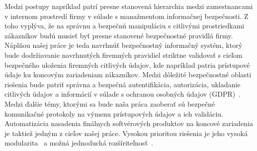 Medzi postupy napríklad patrí presne stanovená hierarchia medzi zamestnancami v internom prostredí firmy v súlade s manažmentom informačnej bezpečnosti.
Z toho vyplýva, že na správnu a bezpečnú manipuláciu s citlivými prostriedkami zákazníkov budú musieť byť presne stanovené
bezpečnostné pravidlá firmy.
Náplňou našej práce je teda navrhnúť bezpečnostný informačný systém, ktorý bude dodržiavanie navrhnutých firemných
pravidiel striktne validovať s cieľom bezpečného uloženia firemných citlivých údajov, kde napríklad patria prístupové
údaje ku koncovým zariadeniam zákazníkov.
Medzi dôležité bezpečnostné oblasti riešenia bude patriť správna a bezpečná autentifikácia, autorizácia, ukladanie
citlivých údajov a informácií v súlade s ochranou osobných údajov (GDPR)~\cite{GDPR}.
Medzi ďalšie témy, ktorými sa bude naša práca zaoberať sú bezpečné komunikačné protokoly na výmenu prístupových údajov a ich validáciu.
Automatizácia nasadenia finálnych softvérových produktov na koncové zariadenia je taktiež jedným z cieľov našej práce.
Vysokou prioritou riešenia je jeho vysoká modularita~\cite{Modularity} a možná jednoduchá rozšíriteľnosť~\cite{Scalability}.
